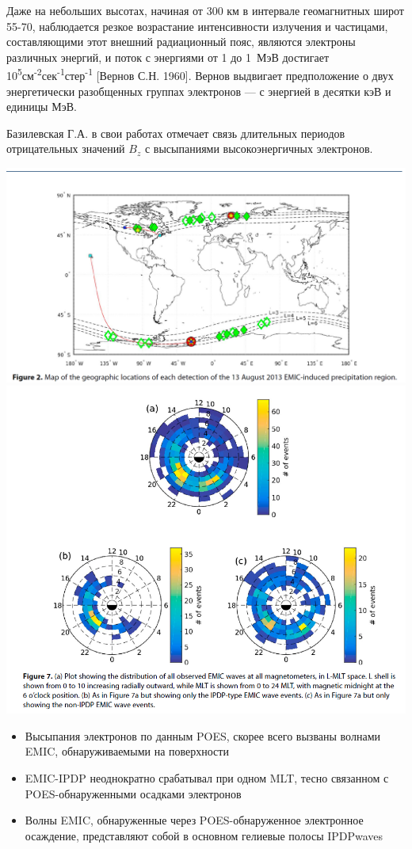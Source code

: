 \documentclass[t, aspectratio=43]{beamer}
\begin{document}
\begin{frame}	
\frametitle{\insertsection} 

{\tiny Даже на небольших высотах, начиная от 300 км в интервале геомагнитных широт 55-70, наблюдается резкое возрастание интенсивности излучения и частицами, составляющими этот внешний радиационный пояс, являются электроны различных энергий, и поток  с энергиями от 1 до 1~МэВ достигает 10\textsuperscript{5}см\textsuperscript{-2}сек\textsuperscript{-1}стер\textsuperscript{-1} [Вернов С.Н. 1960].  Вернов выдвигает предположение о двух энергетически разобщенных группах электронов --- с энергией в десятки кэВ и единицы МэВ. 
	
Базилевская Г.А. в свои работах отмечает связь длительных периодов отрицательных значений $ B_z $ с высыпаниями высокоэнергичных электронов.

 \includegraphics[width=0.6\linewidth]{images/poesemic}
	\includegraphics[width=0.4\linewidth]{mltrep}

 
\begin{itemize}
	\item Высыпания электронов по данным POES, скорее всего вызваны волнами EMIC, обнаруживаемыми на поверхности 
	\item EMIC-IPDP неоднократно срабатывал при одном MLT, тесно связанном с POES-обнаруженными осадками электронов
	\item Волны EMIC, обнаруженные через POES-обнаруженное электронное осаждение, представляют собой в основном гелиевые полосы IPDPwaves
\end{itemize}
}
\end{frame}
	
\end{document}
